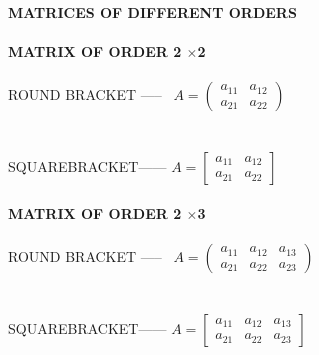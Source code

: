 \documentclass[14pt]{extarticle}
\begin{document}
\noindent
\begin{fleqn} 

\textbf{MATRICES OF DIFFERENT ORDERS} \\ \\

\textbf{MATRIX OF ORDER 2 $\times$2} \\ \\
ROUND BRACKET ----- \ 
\( A = \left( 
\begin{array}{cc} 
a_{11} & a_{12}\\ 
a_{21} & a_{22} 
\end{array} 
\right) \) \\ \\ \\
SQUAREBRACKET------
\( A = \left[ 
\begin{array}{cc} 
a_{11} & a_{12}\\ 
a_{21} & a_{22} 
\end{array} 
\right] \) \\ \\

\textbf{MATRIX OF ORDER 2 $\times$3} \\ \\
ROUND BRACKET ----- \
\( A = \left( 
\begin{array}{ccc} 
a_{11} & a_{12} & a_{13}\\ 
a_{21} & a_{22} & a_{23}
\end{array} 
\right) \)  \\ \\ \\
SQUAREBRACKET------
\( A = \left[ 
\begin{array}{ccc} 
a_{11} & a_{12} & a_{13}\\ 
a_{21} & a_{22} & a_{23}
\end{array} 
\right] \) \\ \\ 


\end{fleqn}
\end{document}
